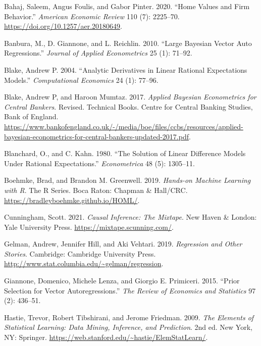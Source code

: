 \documentclass[
  letterpaper,
]{book}
\newlength{\cslhangindent}
\newlength{\cslentryspacingunit} %
\newenvironment{CSLReferences}[2] %
 {%
  \setlength{\parindent}{0pt}
  \ifodd #1
  \let\oldpar\par
  \def\par{\hangindent=\cslhangindent\oldpar}
  \fi
  \setlength{\parskip}{#2\cslentryspacingunit}
 }%
 {}
\begin{document}
\hypertarget{refs}{}
\begin{CSLReferences}{1}{0}
\leavevmode{}%
Bahaj, Saleem, Angus Foulis, and Gabor Pinter. 2020. {``Home Values and
Firm Behavior.''} \emph{American Economic Review} 110 (7): 2225--70.
\url{https://doi.org/10.1257/aer.20180649}.

\leavevmode{}%
Banbura, M., D. Giannone, and L. Reichlin. 2010. {``Large {B}ayesian
Vector Auto Regressions.''} \emph{Journal of Applied Econometrics} 25
(1): 71--92.

\leavevmode{}%
Blake, Andrew P. 2004. {``Analytic Derivatives in Linear Rational
Expectations Models.''} \emph{Computational Economics} 24 (1): 77--96.

\leavevmode{}%
Blake, Andrew P, and Haroon Mumtaz. 2017. \emph{Applied Bayesian
Econometrics for Central Bankers}. Revised. Technical Books. Centre for
Central Banking Studies, Bank of England.
\url{https://www.bankofengland.co.uk/-/media/boe/files/ccbs/resources/applied-bayesian-econometrics-for-central-bankers-updated-2017.pdf}.

\leavevmode{}%
Blanchard, O., and C. Kahn. 1980. {``The Solution of Linear Difference
Models Under Rational Expectations.''} \emph{Econometrica} 48 (5):
1305--11.

\leavevmode{}%
Boehmke, Brad, and Brandon M. Greenwell. 2019. \emph{Hands-on Machine
Learning with {R}}. The {R} Series. Boca Raton: Chapman \& Hall/CRC.
\url{https://bradleyboehmke.github.io/HOML/}.

\leavevmode{}%
Cunningham, Scott. 2021. \emph{Causal Inference: The Mixtape}. New Haven
\& London: Yale University Press. \url{https://mixtape.scunning.com/}.

\leavevmode{}%
Gelman, Andrew, Jennifer Hill, and Aki Vehtari. 2019. \emph{Regression
and Other Stories}. Cambridge: Cambridge University Press.
\url{http://www.stat.columbia.edu/~gelman/regression}.

\leavevmode{}%
Giannone, Domenico, Michele Lenza, and Giorgio E. Primiceri. 2015.
{``{Prior Selection for Vector Autoregressions}.''} \emph{The Review of
Economics and Statistics} 97 (2): 436--51.

\leavevmode{}%
Hastie, Trevor, Robert Tibshirani, and Jerome Friedman. 2009. \emph{The
Elements of Statistical Learning: Data Mining, Inference, and
Prediction}. 2nd ed. New York, NY: Springer.
\url{https://web.stanford.edu/~hastie/ElemStatLearn/}.


\end{CSLReferences}
\end{document}
